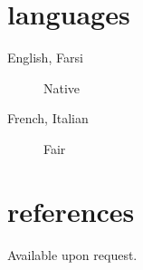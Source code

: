 \documentclass[overlapped,line,10pt,letterpaper]{res}
\begin{document}
\begin{resume}
\section{languages}
\begin{description}
\item[English, Farsi] Native
\item[French, Italian] Fair
\end{description}

\section{references}
Available upon request.
\end{resume}
\end{document}
